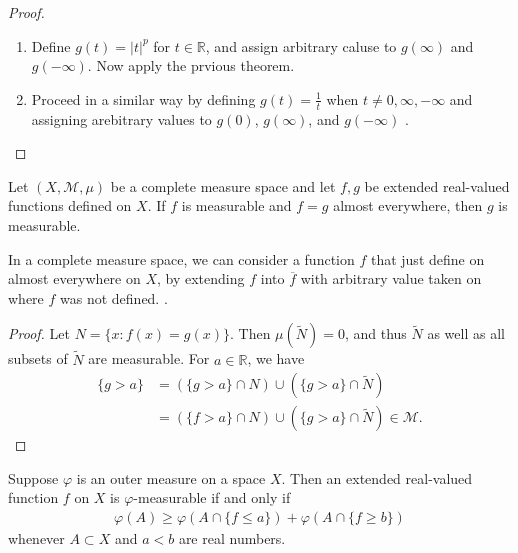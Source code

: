 \documentclass[../main.tex]{subfiles}
\begin{document}
\begin{proof}
    \begin{enumerate}
        \item Define \(  g\left( t \right)= \left| t \right|^{p}    \)  for \(  t\in \mathbb{R}   \), and assign arbitrary caluse to \(  g\left( \infty \right)   \) and \(  g\left( -\infty \right)   \). Now apply the prvious theorem.   
        \item Proceed in a similar way by defining \(  g\left( t \right)= \frac{1 }{t }    \)  when \(  t\neq 0  ,\infty,-\infty\) and assigning arebitrary values to \(  g\left( 0 \right)   \), \(  g\left( \infty \right)   \), and \(  g\left( -\infty \right)   \)    .
    \end{enumerate}
    
\end{proof}
\begin{theorem}{}{}
Let $(X, \mathcal{M}, \mu)$ be a complete measure space and let $f, g$ be extended real-valued functions defined on $X$. If $f$ is measurable and $f=g$ almost everywhere, then $g$ is measurable.
\end{theorem}
\begin{remark}
    In a complete measure space, we can consider a function \(  f  \)  that just define on almost everywhere on \(  X  \), by extending \(  f  \) into \(  \overline{f}  \) with arbitrary value taken on where \(  f  \) was not defined.   . 
\end{remark}
\begin{proof}
Let $N = \{x : f(x) = g(x)\}$. Then $\mu(\widetilde{N}) = 0$, and thus $\widetilde{N}$ as well as all subsets of $\widetilde{N}$ are measurable. For $a \in \mathbb{R}$, we have
\[\begin{aligned}
\{g > a\} &= (\{g > a\} \cap N) \cup (\{g > a\} \cap \widetilde{N}) \\
&= (\{f > a\} \cap N) \cup (\{g > a\} \cap \widetilde{N}) \in \mathcal{M}.
\end{aligned}\]
\end{proof}
\begin{theorem}{}{}
Suppose $\varphi$ is an outer measure on a space $X$. Then an extended real-valued function $f$ on $X$ is $\varphi$-measurable if and only if
\[\begin{aligned}
\varphi(A) \geq \varphi(A \cap \{f \leq a\}) + \varphi(A \cap \{f \geq b\})
\end{aligned}\]
whenever $A \subset X$ and $a < b$ are real numbers.
\end{theorem}
\end{document}
